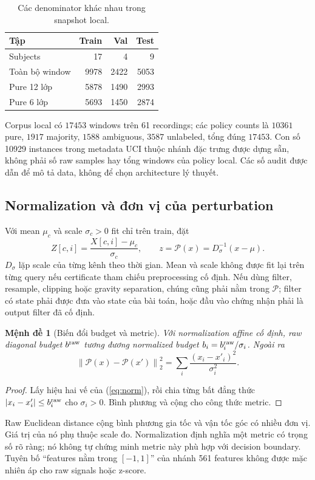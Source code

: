 \documentclass[11pt,a4paper]{article}
\newcommand{\norm}[1]{\left\lVert #1\right\rVert}
\newtheorem{proposition}[definition]{Mệnh đề}
\theoremstyle{remark}
\begin{document}
\begin{table}[htbp]\centering
\caption{Các denominator khác nhau trong snapshot local.}
\begin{tabularx}{\linewidth}{@{}Yrrr@{}}\toprule
Tập & Train & Val & Test\\\midrule
Subjects &17&4&9\\
Toàn bộ window &9978&2422&5053\\
Pure 12 lớp &5878&1490&2993\\
Pure 6 lớp &5693&1450&2874\\\bottomrule
\end{tabularx}
\end{table}
Corpus local có $17453$ windows trên 61 recordings; các policy counts là
$10361$ pure, $1917$ majority, $1588$ ambiguous, $3587$ unlabeled, tổng đúng
$17453$. Con số 10929 instances trong metadata UCI thuộc nhánh đặc trưng
được dựng sẵn, không phải số raw samples hay tổng windows của policy local.
Các số audit được dẫn để mô tả data, không để chọn architecture lý thuyết.

\subsection{Normalization và đơn vị của perturbation}
Với mean $\mu_c$ và scale $\sigma_c>0$ fit chỉ trên train, đặt
\begin{equation}
 Z[c,i]=\frac{X[c,i]-\mu_c}{\sigma_c},\qquad
 z=\mathcal P(x)=D_\sigma^{-1}(x-\mu).
 \label{eq:norm}
\end{equation}
$D_\sigma$ lặp scale của từng kênh theo thời gian. Mean và scale không được
fit lại trên từng query nếu certificate tham chiếu preprocessing cố định.
Nếu dùng filter, resample, clipping hoặc gravity separation, chúng cũng
phải nằm trong $\mathcal P$; filter có state phải được đưa vào state của
bài toán, hoặc đầu vào chứng nhận phải là output filter đã cố định.

\begin{proposition}[Biến đổi budget và metric]
Với normalization affine cố định, raw diagonal budget $b^{\rm raw}$ tương
đương normalized budget $b_i=b_i^{\rm raw}/\sigma_i$. Ngoài ra
\begin{equation}
 \norm{\mathcal P(x)-\mathcal P(x')}^2_2
 =\sum_i\frac{(x_i-x'_i)^2}{\sigma_i^2}.
\end{equation}
\end{proposition}
\begin{proof}
Lấy hiệu hai vế của (\ref{eq:norm}), rồi chia từng bất đẳng thức
$|x_i-x_i'|\le b_i^{\rm raw}$ cho $\sigma_i>0$. Bình phương và cộng cho
công thức metric.
\end{proof}
Raw Euclidean distance cộng bình phương gia tốc và vận tốc góc có nhiều
đơn vị. Giá trị của nó phụ thuộc scale đo. Normalization định nghĩa một
metric có trọng số rõ ràng; nó không tự chứng minh metric này phù hợp với
decision boundary. Tuyên bố ``features nằm trong $[-1,1]$'' của nhánh
561 features không được mặc nhiên áp cho raw signals hoặc z-score.
\end{document}

